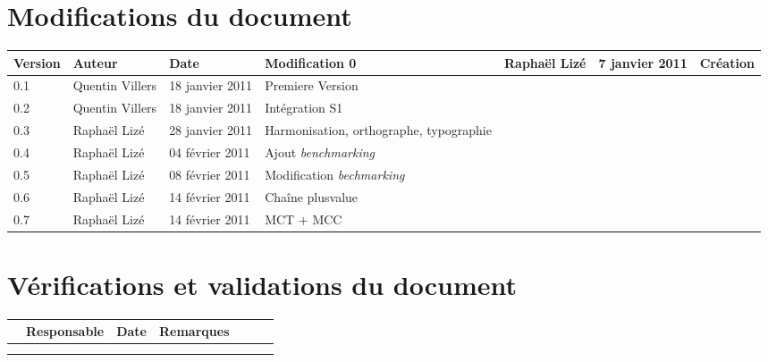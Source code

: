 
\section*{Modifications du document}

\begin{center}
\begin{longtable}{|m{14mm}|m{36mm}|m{36mm}|m{60mm}|}
\hline
Version & Auteur & Date & Modification\endhead \hline
0
& %
Raphaël Lizé
& %
7 janvier 2011
& %
Création
\\\hline
0.1
& %
Quentin Villers
& %
18 janvier 2011
& %
Premiere Version
\\\hline
0.2
& %
Quentin Villers
& %
18 janvier 2011
& %
Intégration S1
\\\hline
0.3
& %
Raphaël Lizé
& %
28 janvier 2011
& %
Harmonisation, orthographe, typographie
\\\hline
0.4
& %
Raphaël Lizé
& %
04 février 2011
& %
Ajout {\sl benchmarking}
\\\hline
0.5
& %
Raphaël Lizé
& %
08 février 2011
& %
Modification {\sl bechmarking}
\\\hline
0.6
& %
Raphaël Lizé
& %
14 février 2011
& %
Chaîne plusvalue
\\\hline
0.7
& %
Raphaël Lizé
& %
14 février 2011
& %
MCT + MCC
\\\hline

\end{longtable}
\end{center}


\section*{Vérifications et validations du document}

\begin{center}
\begin{longtable}{|m{15mm}|m{36mm}|m{36mm}|m{60mm}|}
\hline
 & Responsable & Date & Remarques\endhead \hline
& %
& %
& %
\\\hline

& %

& %

& %

\\\hline

& %

& %

& %

\\\hline
\end{longtable}
\end{center}

\pagebreak

